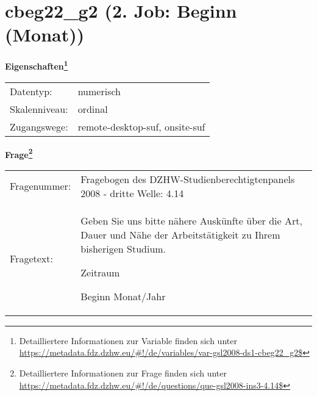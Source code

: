 
    \setcounter{footnote}{0}

    \vspace*{-1.8cm}
	\section{cbeg22\_g2 (2. Job: Beginn (Monat))}
	\label{section:cbeg22_g2}



    \vspace*{0.5cm}
    \noindent\textbf{Eigenschaften\footnote{Detailliertere Informationen zur Variable finden sich unter
		\url{https://metadata.fdz.dzhw.eu/\#!/de/variables/var-gsl2008-ds1-cbeg22_g2$}}}\\
	\begin{tabularx}{\hsize}{@{}lX}
	Datentyp: & numerisch \\
	Skalenniveau: & ordinal \\
	Zugangswege: &
	  remote-desktop-suf, 
	  onsite-suf
 \\
    \end{tabularx}



				\vspace*{0.5cm}
                \noindent\textbf{Frage\footnote{Detailliertere Informationen zur Frage finden sich unter
		              \url{https://metadata.fdz.dzhw.eu/\#!/de/questions/que-gsl2008-ins3-4.14$}}}\\
				\begin{tabularx}{\hsize}{@{}lX}
					Fragenummer: &
					  Fragebogen des DZHW-Studienberechtigtenpanels 2008 - dritte Welle:
					  4.14
 \\
					Fragetext: & Geben Sie uns bitte nähere Auskünfte über die Art, Dauer und Nähe der Arbeitstätigkeit zu Ihrem bisherigen Studium.\par  Zeitraum\par  Beginn Monat/Jahr \\
				\end{tabularx}





